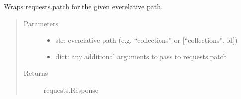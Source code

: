 \documentclass[letterpaper,10pt,english]{sphinxmanual}
\begin{document}
\begin{fulllineitems}
\label{\detokenize{autoapi/pine/backend/data/service/index:pine.backend.data.service.patch}}
Wraps requests.patch for the given eve\sphinxhyphen{}relative path.
\begin{quote}\begin{description}
\item[{Parameters}] \leavevmode\begin{itemize}
\item {} 
 \textendash{} str: eve\sphinxhyphen{}relative path (e.g. “collections” or {[}“collections”, id{]})

\item {} 
 \textendash{} 
dict: any additional arguments to pass to requests.patch


\end{itemize}

\item[{Returns}] \leavevmode
requests.Response

\end{description}\end{quote}

\end{fulllineitems}

\end{document}
